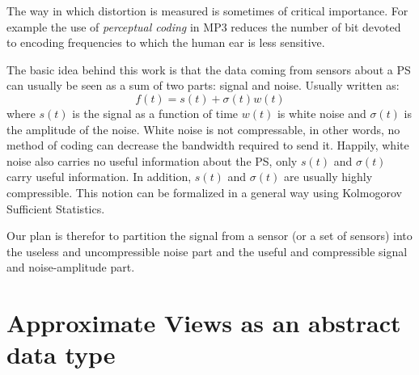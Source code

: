 \documentclass[11pt]{article}
\begin{document}
The way in which distortion is measured is sometimes of critical
importance. For example the use of {\em perceptual coding} in MP3
reduces the number of bit devoted to encoding frequencies to which the
human ear is less sensitive.

The basic idea behind this work is that the data coming from sensors
about a PS can usually be seen as a sum of two parts: signal and
noise. Usually written as:
\[
f(t) = s(t)+\sigma(t) w(t)
\]
where $s(t)$ is the signal as a function of time $w(t)$ is white
noise and $\sigma(t)$ is the amplitude of the noise. White noise is
not compressable, in other words, no method of coding can decrease the
bandwidth required to send it. Happily, white noise also carries no
useful information about the PS, only $s(t)$ and $\sigma(t)$ carry
useful information. In addition, $s(t)$ and $\sigma(t)$ are usually
highly compressible. This notion can be formalized in a general way
using Kolmogorov Sufficient Statistics.

Our plan is therefor to partition the signal from a sensor (or a set
of sensors) into the useless and uncompressible noise part and the
useful and compressible signal and noise-amplitude part.

\section{Approximate Views as an abstract data type}
\end{document}
